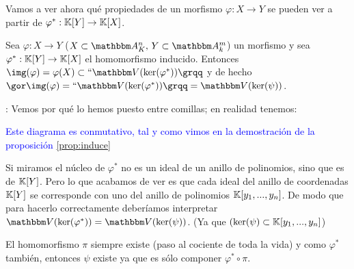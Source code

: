 Vamos a ver ahora qué propiedades de un morfismo $\varphi: X \rightarrow Y$ se pueden ver a partir de $\varphi^*: \mathbb{K}[Y] \rightarrow \mathbb{K}[X]$.

\begin{lemma}[Clave]\label{lem:morf}
	Sea  $\varphi: X \rightarrow Y$ ($X  \subset \Akn,\, Y \subset \A_k^m$) un morfismo y sea $\varphi^*:\mathbb{K}[Y] \rightarrow \mathbb{K}[X]$ el homomorfismo inducido. Entonces $\img(\varphi)=\varphi(X) \subset ``\V(\ker (\varphi^*))\grqq$ y de hecho $\cls{\img(\varphi)}=``\V(\ker(\varphi^*))\grqq=\V(\ker(\psi))$.
\end{lemma}

	\notacion: Vemos por qué lo hemos puesto entre comillas; en realidad tenemos:



	\textcolor{blue}{Este diagrama es conmutativo, tal y como vimos en la demostración de la proposición \ref{prop:induce}}





	Si miramos el núcleo de $\varphi^*$ no es un ideal de un anillo de polinomios, sino que es de $\mathbb{K}[Y]$. Pero lo que acabamos de ver es que cada ideal del anillo de coordenadas $\mathbb{K}[Y]$ se corresponde con uno del anillo de polinomios $\mathbb{K}[y_1,...,y_n]$. De modo que para hacerlo correctamente deberíamos interpretar $\V(\ker(\varphi^*))= \V(\ker(\psi))$. (Ya que $(\ker(\psi) \subset \mathbb{K}[y_1,...,y_n]$)

	El homomorfismo $\pi$ siempre existe (paso al cociente de toda la vida) y como $\varphi^*$ también, entonces $\psi$ existe ya que es sólo componer $\varphi^* \circ \pi$.

